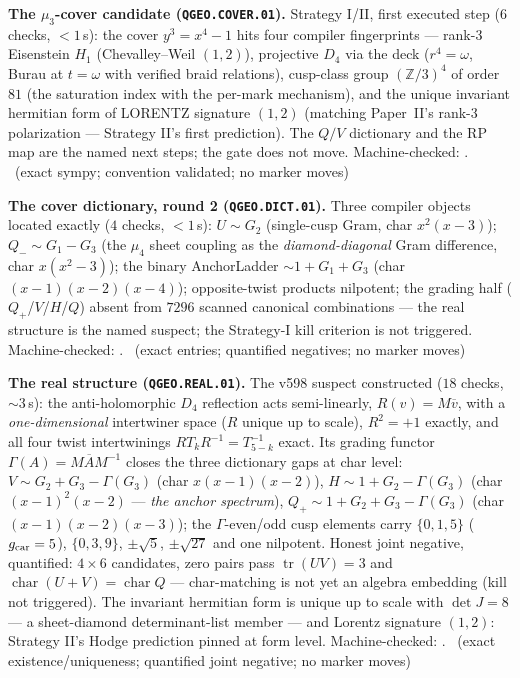 \par\smallskip\noindent\textbf{The $\mu_3$-cover candidate
(\texttt{QGEO.COVER.01}).}
Strategy I/II, first executed step ($6$ checks, $<1$\,s): the cover
$y^3=x^4-1$ hits four compiler fingerprints --- rank-3 Eisenstein
$H_1$ (Chevalley--Weil $(1,2)$), projective $D_4$ via the deck
($r^4=\omega$, Burau at $t=\omega$ with verified braid relations),
cusp-class group $(\mathbb{Z}/3)^4$ of order $81$ (the saturation
index with the per-mark mechanism), and the unique invariant hermitian
form of LORENTZ signature $(1,2)$ (matching Paper~II's rank-3
polarization --- Strategy II's first prediction).  The $Q/V$
dictionary and the RP map are the named next steps; the gate does not
move. Machine-checked: .
\mE\ (exact sympy; convention validated; no marker moves)
\par\smallskip

\par\smallskip\noindent\textbf{The cover dictionary, round 2
(\texttt{QGEO.DICT.01}).}
Three compiler objects located exactly ($4$ checks, $<1$\,s):
$U\sim G_2$ (single-cusp Gram, char $x^2(x-3)$); $Q_-\sim G_1-G_3$
(the $\mu_4$ sheet coupling as the \emph{diamond-diagonal} Gram
difference, char $x(x^2-3)$); the binary AnchorLadder
$\sim1+G_1+G_3$ (char $(x-1)(x-2)(x-4)$); opposite-twist products
nilpotent; the grading half ($Q_+$/$V$/$H$/$Q$) absent from $7296$
scanned canonical combinations --- the real structure is the named
suspect; the Strategy-I kill criterion is not triggered.
Machine-checked: .
\mE\ (exact entries; quantified negatives; no marker moves)
\par\smallskip

\par\smallskip\noindent\textbf{The real structure
(\texttt{QGEO.REAL.01}).}
The v598 suspect constructed ($18$ checks, ${\sim}3$\,s): the
anti-holomorphic $D_4$ reflection acts semi-linearly,
$R(v)=M\overline{v}$, with a \emph{one-dimensional} intertwiner space
($R$ unique up to scale), $R^2=+1$ exactly, and all four twist
intertwinings $RT_kR^{-1}=T_{5-k}^{-1}$ exact.  Its grading functor
$\Gamma(A)=M\overline{A}M^{-1}$ closes the three dictionary gaps at
char level: $V\sim G_2+G_3-\Gamma(G_3)$ (char $x(x-1)(x-2)$),
$H\sim 1+G_2-\Gamma(G_3)$ (char $(x-1)^2(x-2)$ --- \emph{the anchor
spectrum}), $Q_+\sim 1+G_2+G_3-\Gamma(G_3)$ (char $(x-1)(x-2)(x-3)$);
the $\Gamma$-even/odd cusp elements carry $\{0,1,5\}$ ($g_{\mathrm{car}}=5$),
$\{0,3,9\}$, $\pm\sqrt5$, $\pm\sqrt{27}$ and one nilpotent.  Honest
joint negative, quantified: $4\times6$ candidates, zero pairs pass
$\operatorname{tr}(UV)=3$ and $\operatorname{char}(U{+}V)=
\operatorname{char}Q$ --- char-matching is not yet an algebra
embedding (kill not triggered).  The invariant hermitian form is
unique up to scale with $\det J=8$ --- a sheet-diamond
determinant-list member --- and Lorentz signature $(1,2)$: Strategy
II's Hodge prediction pinned at form level.
Machine-checked: .
\mE\ (exact existence/uniqueness; quantified joint negative; no
marker moves)
\par\smallskip

